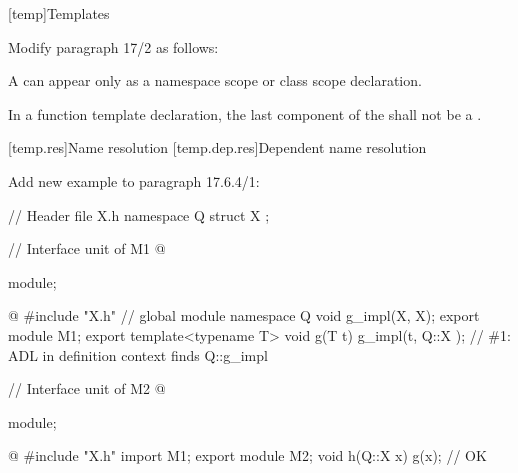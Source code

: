 \setcounter{chapter}{16}
[temp]{Templates}%

\noindent
Modify paragraph 17/2 as follows:
\begin{std.txt}
  \resetalinea[1]
  \alinea
  A  can appear only as a 
  namespace scope or class scope declaration.
  \begin{before}\end{before}
  In a function template declaration, the last component of the 
   shall not be a . 
\end{std.txt}






\setcounter{section}{5}
[temp.res]{Name resolution}
\setcounter{subsection}{3}
[temp.dep.res]{Dependent name resolution}

Add new example to paragraph 17.6.4/1:
\begin{std.txt}
  \begin{addedblock}
  \enterexample
  \begin{codeblock}
    // Header file X.h
    namespace Q { 
       struct X { };
    }

    // Interface unit of M1
    @\begin{after}\color{addclr}
    module;
    \end{after}@
    #include "X.h"       // global module
    namespace Q {
       void g_impl(X, X);
    }
    export module M1;
    export template<typename T>
    void g(T t) {
       g_impl(t, Q::X{ });  // \#1: ADL in definition context finds Q::g_impl
    }

    // Interface unit of M2
    @\begin{after}\color{addclr}
    module;
    \end{after}@
    #include "X.h"
    import M1;
    export module M2;
    void h(Q::X x) {
       g(x);               // OK
    }
  \end{codeblock}
  \exitexample
\end{addedblock}
\end{std.txt}


